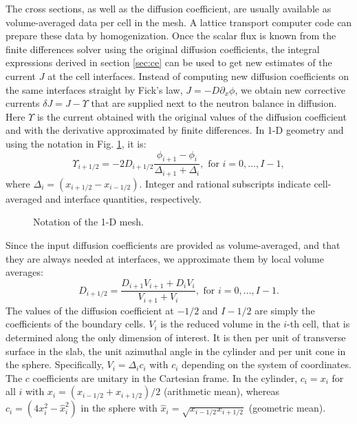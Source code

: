 \documentclass{ictt26}
\begin{document}
The cross sections, as well as the diffusion coefficient, are usually available as volume-averaged data per cell in the mesh. A lattice transport computer code can prepare these data by homogenization. Once the scalar flux is known from the finite differences solver using the original diffusion coefficients, the integral expressions derived in section \ref{sec:ce} can be used to get new estimates of the current $J$ at the cell interfaces. %
Instead of computing new diffusion coefficients on the same interfaces straight by Fick's law, $J = -D \partial_x \phi$, we obtain new corrective currents $\delta J = J - \Upsilon$ that are supplied next to the neutron balance in diffusion. Here $\Upsilon$ is the current obtained with the original values of the diffusion coefficient and with the derivative approximated by finite differences. In 1-D %
geometry and using the notation in Fig. \ref{fig:mesh1D}, it is:
\begin{equation}
  \Upsilon_{i+1/2} = -2 D_{i+1/2} \frac{\phi_{i+1} - \phi_{i}}{\Delta_{i+1} + \Delta_{i}}, \text{ for } i = 0, \ldots, I-1,
  \label{eq:cmfd}
\end{equation}
where $\Delta_i = (x_{i+1/2} - x_{i-1/2})$. Integer and rational subscripts indicate cell-averaged and interface quantities, respectively.
%
\begin{figure}[b]
\centering

\caption{Notation of the 1-D mesh.}
\label{fig:mesh1D}
\end{figure}
Since the input diffusion coefficients are provided as volume-averaged, and that they are always needed at interfaces, we approximate them by local volume averages:
\begin{equation}
  D_{i+1/2} = \frac{D_{i+1} V_{i+1} + D_{i} V_i}{V_{i+1} + V_i}, \text{ for } i = 0, \ldots, I-1.
  \label{eq:dc0}
\end{equation}
The values of the diffusion coefficient at $-1/2$ and $I-1/2$ are simply the coefficients of the boundary cells. $V_i$ is the reduced volume in the $i$-th cell, that is determined along the only dimension of interest. It is then per unit of transverse surface in the slab, the unit azimuthal angle in the cylinder and per unit cone in the sphere. Specifically, $V_i = \Delta_i c_i$ with $c_i$ depending on the system of coordinates. The $c$ coefficients are unitary in the Cartesian frame. In the cylinder, $c_i = x_i$ for all $i$ with $x_i = (x_{i-1/2} + x_{i+1/2}) / 2$ (arithmetic mean), whereas $c_i = (4 x_i^2 - \hat{x}_i^2)$ in the sphere with $\hat{x}_i = \sqrt{x_{i-1/2} x_{i+1/2}}$ (geometric mean).
\end{document}
